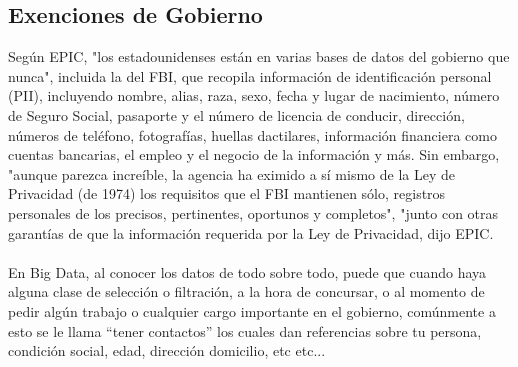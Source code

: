 \documentclass[journal]{IEEEtran}
\begin{document}
\subsection{Exenciones de Gobierno}
Según EPIC, "los estadounidenses están en varias bases de datos del gobierno que nunca", incluida la del FBI, que recopila información de identificación personal (PII), incluyendo nombre, alias, raza, sexo, fecha y lugar de nacimiento, número de Seguro Social, pasaporte y el número de licencia de conducir, dirección, números de teléfono, fotografías, huellas dactilares, información financiera como cuentas bancarias, el empleo y el negocio de la información y más. Sin embargo, "aunque parezca increíble, la agencia ha eximido a sí mismo de la Ley de Privacidad (de 1974) los requisitos que el FBI mantienen sólo, registros personales de los precisos, pertinentes, oportunos y completos", "junto con otras garantías de que la información requerida por la Ley de Privacidad, dijo EPIC.\\ \\
En Big Data, al conocer los datos de todo sobre todo, puede que cuando haya alguna clase de selección o filtración, a la hora de concursar, o al momento de pedir algún trabajo o cualquier cargo importante en el gobierno, comúnmente a esto se le llama “tener contactos” los cuales dan referencias sobre tu persona, condición social, edad, dirección domicilio, etc etc...
\end{document}

